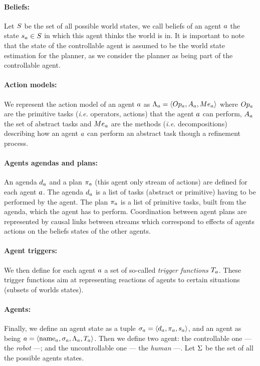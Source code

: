 \documentclass[a4paper,11pt,twoside]{StyleThese}
\begin{document}
\paragraph{\bf Beliefs:}
Let $S$ be the set of all possible world states, we call beliefs of an agent $a$ the state $s_{a} \in S$ in which this agent thinks the world is in. It is important to note that the state of the controllable agent is assumed to be the world state estimation for the planner, as we consider the planner as being part of the controllable agent.

\paragraph{\bf Action models:}
We represent the action model of an agent $a$ as $\Lambda_{a} = \langle Op_{a}, A_{a}, Me_{a} \rangle$ where $Op_{a}$ are the primitive tasks (\textit{i.e.} operators, actions) that the agent $a$ can perform, $A_{a}$ the set of abstract tasks and $Me_{a}$ are the methods (\textit{i.e.} decompositions) describing how an agent $a$ can perform an abstract task though a refinement process.

\paragraph{\bf Agents agendas and plans:}
An agenda $d_{a}$ and a plan $\pi_{a}$ (this agent only stream of actions) are defined for each agent $a$. The agenda $d_{a}$ is a list of tasks (abstract or primitive) having to be performed by the agent. The plan $\pi_{a}$ is a list of primitive tasks, built from the agenda, which the agent has to perform.
Coordination between agent plans are represented by causal links between streams which correspond to effects of agents actions on the beliefs states of the other agents. 

\paragraph{\bf Agent triggers:}
We then define for each agent $a$ a set of so-called \textit{trigger functions} $T_{a}$. These trigger functions aim at representing reactions of agents to certain situations (subsets of worlds states).

\paragraph{\bf Agents:}
Finally, we define an agent state as a tuple $\sigma_{a} = \langle  d_{a}, \pi_{a}, s_{a} \rangle$, and an agent as being $a = \langle \text{name}_{a}, \sigma_{a}, \Lambda_{a}, T_{a} \rangle$. Then we define two agent: the controllable one --- the \textit{robot} ---; and the uncontrollable one --- the \textit{human} ---. Let $\Sigma$ be the set of all the possible agents states.
\end{document}
